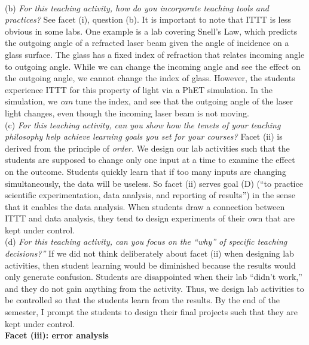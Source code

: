 \documentclass[../../../main.tex]{subfiles}
\begin{document}
\\
\vspace{0.25cm}
(b) \textit{For this teaching activity, how do you incorporate teaching tools and practices?}  See facet (i), question (b).  It is important to note that ITTT is less obvious in some labs.  One example is a lab covering Snell's Law, which predicts the outgoing angle of a refracted laser beam given the angle of incidence on a glass surface.  The glass has a fixed index of refraction that relates incoming angle to outgoing angle.  While we can change the incoming angle and see the effect on the outgoing angle, we cannot change the index of glass.  However, the students experience ITTT for this property of light via a PhET simulation.  In the simulation, we \textit{can} tune the index, and see that the outgoing angle of the laser light changes, even though the incoming laser beam is not moving.
\\
\vspace{0.25cm}
(c) \textit{For this teaching activity, can you show how the tenets of your teaching philosophy help achieve learning goals you
set for your courses?}  Facet (ii) is derived from the principle of \textit{order.}  We design our lab activities such that the students are supposed to change only one input at a time to examine the effect on the outcome.  Students quickly learn that if too many inputs are changing simultaneously, the data will be useless.  So facet (ii) serves goal (D) (``to practice scientific experimentation, data analysis, and reporting of results'') in the sense that it enables the data analysis.  When students draw a connection between ITTT and data analysis, they tend to design experiments of their own that are kept under control.
\\
\vspace{0.25cm}
(d) \textit{For this teaching activity, can you focus on the ``why'' of specific teaching decisions?''}  If we did not think deliberately about facet (ii) when designing lab activities, then student learning would be diminished because the results would only generate confusion.  Students are disappointed when their lab ``didn't work,'' and they do not gain anything from the activity.  Thus, we design lab activities to be controlled so that the students learn from the results.  By the end of the semester, I prompt the students to design their final projects such that they are kept under control.
\\
\vspace{0.25cm}
\textbf{Facet (iii): error analysis}
\\
\end{document}
